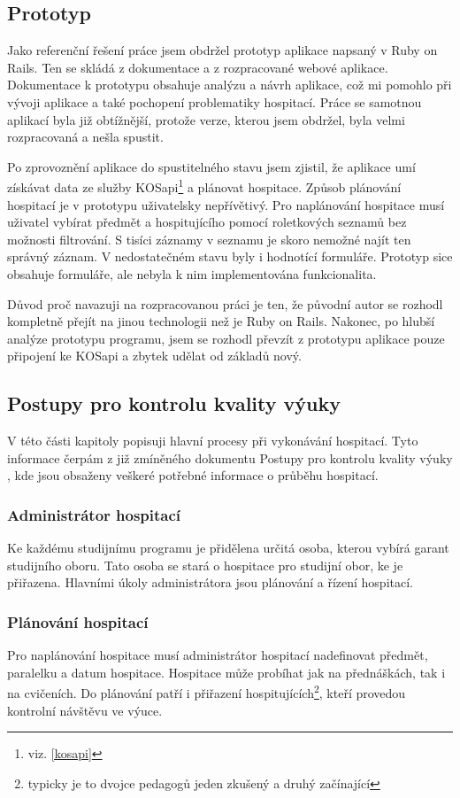 \subsection{Prototyp}

Jako referenční řešení práce jsem obdržel prototyp aplikace napsaný v Ruby on Rails. Ten se skládá z dokumentace a z rozpracované webové aplikace. Dokumentace k prototypu obsahuje analýzu a návrh aplikace, což  mi pomohlo při vývoji aplikace a také pochopení problematiky hospitací. Práce se samotnou aplikací byla již obtížnější, protože verze, kterou jsem obdržel, byla velmi rozpracovaná a nešla spustit. 

Po zprovoznění aplikace do spustitelného stavu jsem zjistil, že aplikace umí získávat data ze služby KOSapi\footnote{viz. \ref{kosapi}} a plánovat hospitace. Způsob plánování hospitací je v prototypu uživatelsky nepřívětivý. Pro naplánování hospitace musí uživatel vybírat předmět a hospitujícího pomocí roletkových seznamů bez možnosti filtrování. S tisíci záznamy v seznamu je skoro nemožné najít ten správný záznam. V nedostatečném stavu byly i hodnotící formuláře. Prototyp sice obsahuje formuláře, ale nebyla k nim implementována funkcionalita. 

Důvod proč navazuji na rozpracovanou práci je ten, že původní autor se rozhodl kompletně přejít na jinou technologii než je Ruby on Rails. Nakonec, po hlubší analýze prototypu programu, jsem se rozhodl převzít z prototypu aplikace pouze připojení ke KOSapi a zbytek udělat od základů nový. 

\subsection{Postupy pro kontrolu kvality výuky}
V této části kapitoly popisuji hlavní procesy při vykonávání hospitací. Tyto informace čerpám z již zmíněného dokumentu Postupy pro kontrolu kvality výuky \cite{postupy}, kde jsou obsaženy veškeré potřebné informace o průběhu hospitací.

\subsubsection{Administrátor hospitací}
Ke každému studijnímu programu je přidělena určitá osoba, kterou vybírá garant studijního oboru. Tato osoba se stará o hospitace pro studijní obor, ke je přiřazena. Hlavními úkoly administrátora jsou plánování a řízení hospitací.

\subsubsection{Plánování hospitací}
Pro naplánování hospitace musí administrátor hospitací nadefinovat předmět, paralelku a datum hospitace. Hospitace může probíhat jak na přednáškách, tak i na cvičeních. Do plánování patří i přiřazení hospitujících\footnote{typicky je to dvojce pedagogů jeden zkušený a druhý začínající}, kteří provedou kontrolní návštěvu ve výuce.

